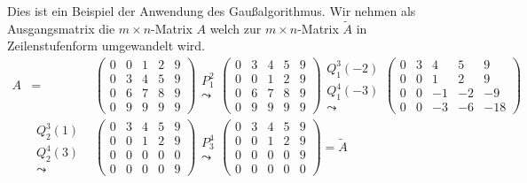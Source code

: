 Dies ist ein Beispiel der Anwendung des Gaußalgorithmus.
Wir nehmen als  Ausgangsmatrix die $m\times n$-Matrix $A$ welch zur $m \times n$-Matrix $\tilde{A}$ in Zeilenstufenform umgewandelt wird.  
\begin{eqnarray*}
A&=&\begin{pmatrix}
0 & 0 & 1 & 2 & 9 \\ 
0 & 3 & 4 & 5 & 9 \\ 
0 & 6 & 7 & 8 & 9 \\ 
0 & 9 & 9 & 9 & 9
\end{pmatrix}
\substack{P_1^2\\\leadsto}
\begin{pmatrix}
0 & 3 & 4 & 5 & 9 \\ 
0 & 0 & 1 & 2 & 9 \\ 
0 & 6 & 7 & 8 & 9 \\ 
0 & 9 & 9 & 9 & 9
\end{pmatrix}
\substack{Q_1^3(-2)\\Q_1^4(-3)\\\leadsto} 
\begin{pmatrix}
 0 & 3 & 4 & 5 & 9 \\ 
 0 & 0 & 1 & 2 & 9 \\ 
 0 & 0 & -1 & -2 & -9 \\ 
 0 & 0 & -3 & -6 & -18
\end{pmatrix}\\
&\substack{Q_2^3(1)\\Q_2^4(3)\\\leadsto} &
\begin{pmatrix}
  0 & 3 & 4 & 5 & 9 \\ 
  0 & 0 & 1 & 2 & 9 \\ 
  0 & 0 & 0 & 0 & 0 \\ 
  0 & 0 & 0 & 0 & 9
  \end{pmatrix}
\substack{P_3^4\\\leadsto}
\begin{pmatrix}
  0 & 3 & 4 & 5 & 9 \\ 
  0 & 0 & 1 & 2 & 9 \\ 
  0 & 0 & 0 & 0 & 9 \\ 
  0 & 0 & 0 & 0 & 0
 \end{pmatrix}=\tilde{A}  
 \end{eqnarray*}
 
